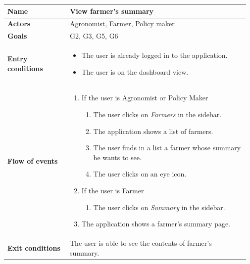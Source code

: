 \begin{table}[H]
    \centering
	\begin{tabular}{@{}p{0.25\linewidth} p{0.72\linewidth}@{}}
    \toprule
		\textbf{Name}               & View farmer's summary\\
		\midrule
		\textbf{Actors}             & Agronomist, Farmer, Policy maker\\
		\midrule
		\textbf{Goals}              & G2, G3, G5, G6 \\
		\midrule
		
		\textbf{Entry conditions}   & \begin{itemize}[leftmargin=.4cm,noitemsep,topsep=0pt,before=\vspace{-3mm},after=\vspace{-4mm}]
		    \item The user is already logged in to the application.
		    \item The user is on the dashboard view.
		\end{itemize}\\
		\midrule
		
		\textbf{Flow of events}     & \begin{enumerate}[leftmargin=.4cm,noitemsep,topsep=0pt,before=\vspace{-3mm},after=\vspace{-4mm}]
		    \item If the user is Agronomist or Policy Maker
		    \begin{enumerate}[noitemsep]
		        \item The user clicks on \textit{Farmers} in the sidebar.
		        \item The application shows a list of farmers.
		        \item The user finds in a list a farmer whose summary he wants to see.
		        \item The user clicks on an eye icon.
		    \end{enumerate}
		    \item If the user is Farmer
		    \begin{enumerate}[noitemsep]
		        \item The user clicks on \textit{Summary} in the sidebar.
		    \end{enumerate}
		    \item The application shows a farmer's summary page.
		\end{enumerate}\\
		\midrule
		\textbf{Exit conditions}    & The user is able to see the contents of farmer's summary. \\
		\midrule
		

\end{tabular}
\end{table}
